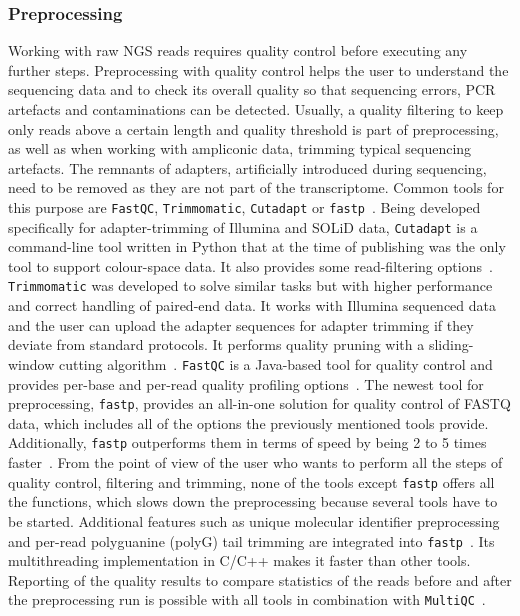 \subsubsection*{Preprocessing}
Working with raw \ac{NGS} reads requires quality control before executing any further steps. Preprocessing with quality control helps the user to understand the sequencing data and to check its overall quality so that sequencing errors, \ac{PCR} artefacts and contaminations can be detected. Usually, a quality filtering to keep only reads above a certain length and quality threshold is part of preprocessing, as well as when working with ampliconic data, trimming typical sequencing artefacts. The remnants of adapters, artificially introduced during sequencing, need to be removed as they are not part of the transcriptome. Common tools for this purpose are \texttt{FastQC}, \texttt{Trimmomatic}, \texttt{Cutadapt} or \texttt{fastp}~\cite{andrews2010fastqc, bolger2014trimmomatic, martin2011cutadapt, chen2018fastp}. Being developed specifically for adapter-trimming of Illumina and SOLiD data, \texttt{Cutadapt} is a command-line tool written in Python that at the time of publishing was the only tool to support colour-space data. It also provides some read-filtering options~\cite{martin2011cutadapt}. \texttt{Trimmomatic} was developed to solve similar tasks but with higher performance and correct handling of paired-end data. It works with Illumina sequenced data and the user can upload the adapter sequences for adapter trimming if they deviate from standard protocols. It performs quality pruning with a sliding-window cutting algorithm~\cite{bolger2014trimmomatic}. \texttt{FastQC} is a Java-based tool for quality control and provides per-base and per-read quality profiling options~\cite{andrews2010fastqc}. The newest tool for preprocessing, \texttt{fastp}, provides an all-in-one solution for quality control of FASTQ data, which includes all of the options the previously mentioned tools provide. Additionally, \texttt{fastp} outperforms them in terms of speed by being 2 to 5 times faster~\cite{chen2018fastp}. From the point of view of the user who wants to perform all the steps of quality control, filtering and trimming, none of the tools except \texttt{fastp} offers all the functions, which slows down the preprocessing because several tools have to be started. Additional features such as unique molecular identifier preprocessing and per-read polyguanine (polyG) tail trimming are integrated into \texttt{fastp}~\cite{chen2018fastp}. Its multithreading implementation in C/C++ makes it faster than other tools. Reporting of the quality results to compare statistics of the reads before and after the preprocessing run is possible with all tools in combination with \texttt{MultiQC}~\cite{ewels2016multiqc}.

